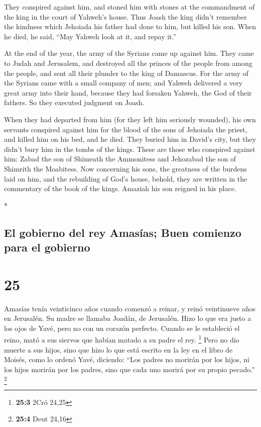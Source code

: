 \begin{paracol}{2}
\begin{otherlanguage}{english}
 They conspired against him, and stoned him with stones
at the commandment of the king in the court of Yahweh's house.
 Thus Joash the king didn't remember the kindness which
Jehoiada his father had done to him, but killed his son. When he died,
he said, ``May Yahweh look at it, and repay it.''

 At the end of the year, the army of the Syrians came up
against him. They came to Judah and Jerusalem, and destroyed all the
princes of the people from among the people, and sent all their plunder
to the king of Damascus.  For the army of the Syrians
came with a small company of men; and Yahweh delivered a very great army
into their hand, because they had forsaken Yahweh, the God of their
fathers. So they executed judgment on Joash.

 When they had departed from him (for they left him
seriously wounded), his own servants conspired against him for the blood
of the sons of Jehoiada the priest, and killed him on his bed, and he
died. They buried him in David's city, but they didn't bury him in the
tombs of the kings.  These are those who conspired
against him: Zabad the son of Shimeath the Ammonitess and Jehozabad the
son of Shimrith the Moabitess.  Now concerning his sons,
the greatness of the burdens laid on him, and the rebuilding of God's
house, behold, they are written in the commentary of the book of the
kings. Amaziah his son reigned in his place.

\end{otherlanguage}

\switchcolumn[0]*

\hypertarget{el-gobierno-del-rey-amasuxedas-buen-comienzo-para-el-gobierno}{%
\subsection{El gobierno del rey Amasías; Buen comienzo para el
gobierno}\label{el-gobierno-del-rey-amasuxedas-buen-comienzo-para-el-gobierno}}

\hypertarget{section-48}{%
\section{25}\label{section-48}}

 Amasías tenía veinticinco años cuando comenzó a reinar, y
reinó veintinueve años en Jerusalén. Su madre se llamaba Joadán, de
Jerusalén.  Hizo lo que era justo a los ojos de Yavé, pero
no con un corazón perfecto.  Cuando se le estableció el
reino, mató a sus siervos que habían matado a su padre el rey.
\footnote{\textbf{25:3} 2Cró 24,25}  Pero no dio muerte a
sus hijos, sino que hizo lo que está escrito en la ley en el libro de
Moisés, como lo ordenó Yavé, diciendo: ``Los padres no morirán por los
hijos, ni los hijos morirán por los padres, sino que cada uno morirá por
su propio pecado.'' \footnote{\textbf{25:4} Deut 24,16}


\end{paracol}
